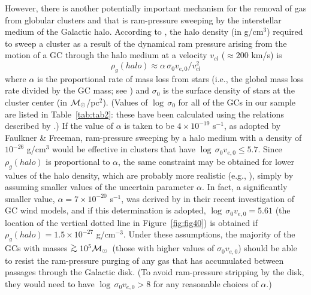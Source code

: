 \documentclass[12pt,preprint]{aastex}
\newcommand\msol{{\cal M_{\odot}}}
\newcommand\gta{\mathrel{\hbox{\raise 0.6 ex \hbox{$>$}\kern
                   -1.7 ex\lower .5 ex\hbox{$\sim$}}}}
\begin{document}
However, there is another potentially important mechanism for the removal of
gas from globular clusters and that is ram-pressure sweeping by the interstellar
medium of the Galactic halo.  According to \citet{fg76}, the halo density (in
g/cm$^3$) required to sweep a cluster as a result of the dynamical ram pressure
arising from the motion of a GC through the halo medium at a velocity $v_{cl}$ 
($\approx 200$ km/s) is
          $$\rho_g(halo) \approx \alpha\,\sigma_0v_{e,0}/v_{cl}^2$$
where $\alpha$ is the proportional rate of mass loss from stars (i.e., the 
global mass loss rate divided by the GC mass; see \citealt{ff77}) and $\sigma_0$
is the surface density of stars at the cluster center (in $\msol$/pc$^2$).
(Values of $\log\,\sigma_0$ for all of the GCs in our sample are listed in
Table~\ref{tab:tab2}: these have been calculated using the relations described
by \citealt{vf77}.)  If the value of $\alpha$ is taken to be $4 \times 10^{-19}$
s$^{-1}$, as adopted by Faulkner \& Freeman, ram-pressure sweeping by a halo
medium with a density of $10^{-26}$ g/cm$^3$ would be effective in clusters
that have $\log\,\sigma_0v_{e,0} \le 5.7$.  Since $\rho_g(halo)$ is proportional
to $\alpha$, the same constraint may be obtained for lower values of the halo
density, which are probably more realistic (e.g., \citealt{si74}), simply by
assuming smaller values of the uncertain parameter $\alpha$.  In fact, a
significantly smaller value, $\alpha = 7\times 10^{-20}$ s$^{-1}$, was derived 
by \citet{prs11} in their recent investigation of GC wind models, and if this
determination is adopted, $\log\,\sigma_0v_{e,0} = 5.61$ (the location of the
vertical dotted line in Figure~\ref{fig:fig40}) is obtained if $\rho_g(halo) =
1.5\times 10^{-27}$ g/cm$^{-3}$.  Under these assumptions, the majority of the
GCs with masses $\gta 10^5 \msol$\ (those with higher values of
$\sigma_0v_{e,0}$) should be able to resist the ram-pressure purging of any
gas that has accumulated between passages through the Galactic disk.  (To avoid
ram-pressure stripping by the disk, they would need to have
$\log\,\sigma_0v_{e,0} > 8$ for any reasonable choices of $\alpha$.)
\end{document}
